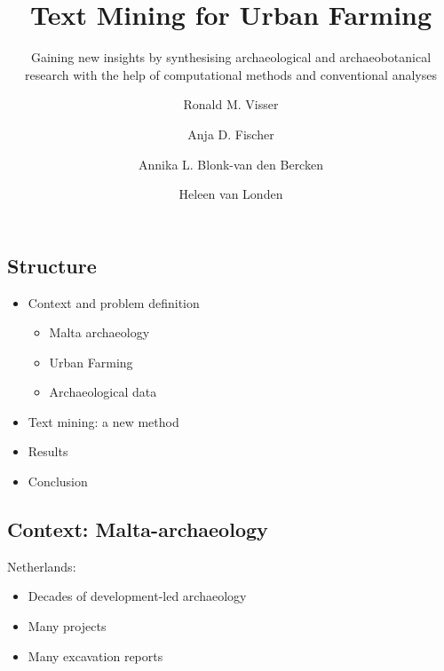\documentclass[
  letterpaper,
  DIV=11,
  numbers=noendperiod]{scrartcl}
\title{Text Mining for Urban Farming}
\subtitle{Gaining new insights by synthesising archaeological and
archaeobotanical research with the help of computational methods and
conventional analyses}
\author{Ronald M. Visser \and Anja D. Fischer \and Annika L. Blonk-van
den Bercken \and Heleen van Londen}
\date{}
\providecommand{\tightlist}{%
  \setlength{\itemsep}{0pt}\setlength{\parskip}{0pt}}\usepackage{longtable,booktabs,array}
\begin{document}
\maketitle
\ifdefined\Shaded\renewenvironment{Shaded}{\begin{tcolorbox}[boxrule=0pt, borderline west={3pt}{0pt}{shadecolor}, frame hidden, breakable, sharp corners, interior hidden, enhanced]}{\end{tcolorbox}}\fi

\hypertarget{structure}{%
\subsection{Structure}\label{structure}}

\begin{itemize}
\tightlist
\item
  Context and problem definition

  \begin{itemize}
  \tightlist
  \item
    Malta archaeology
  \item
    Urban Farming
  \item
    Archaeological data
  \end{itemize}
\item
  Text mining: a new method
\item
  Results
\item
  Conclusion
\end{itemize}

\hypertarget{context-malta-archaeology}{%
\subsection{Context:
Malta-archaeology}\label{context-malta-archaeology}}

Netherlands:

\begin{itemize}
\tightlist
\item
  Decades of development-led archaeology
\item
  Many projects
\item
  Many excavation reports
\end{itemize}
\end{document}

